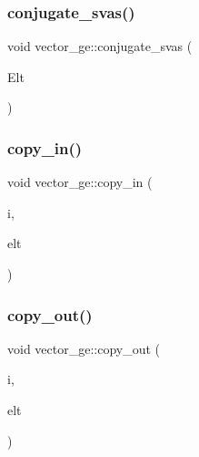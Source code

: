 \mbox{\label{classvector__ge_a8b245f21a8fead39b00df7b18593ea44}} 
\subsubsection{\texorpdfstring{conjugate\+\_\+svas()}{conjugate\_svas()}}
{\footnotesize\ttfamily void vector\+\_\+ge\+::conjugate\+\_\+svas (\begin{DoxyParamCaption}\item[{\mbox{\hyperlink{galois_8h_a09fddde158a3a20bd2dcadb609de11dc}{I\+NT}} $\ast$}]{Elt }\end{DoxyParamCaption})}

\mbox{\label{classvector__ge_ad02ebf2d4e8bbf095685aea921999145}} 
\subsubsection{\texorpdfstring{copy\+\_\+in()}{copy\_in()}}
{\footnotesize\ttfamily void vector\+\_\+ge\+::copy\+\_\+in (\begin{DoxyParamCaption}\item[{\mbox{\hyperlink{galois_8h_a09fddde158a3a20bd2dcadb609de11dc}{I\+NT}}}]{i,  }\item[{\mbox{\hyperlink{galois_8h_a09fddde158a3a20bd2dcadb609de11dc}{I\+NT}} $\ast$}]{elt }\end{DoxyParamCaption})}

\mbox{\label{classvector__ge_a3fd040b3b6f1227bd4a7696aba0adf37}} 
\subsubsection{\texorpdfstring{copy\+\_\+out()}{copy\_out()}}
{\footnotesize\ttfamily void vector\+\_\+ge\+::copy\+\_\+out (\begin{DoxyParamCaption}\item[{\mbox{\hyperlink{galois_8h_a09fddde158a3a20bd2dcadb609de11dc}{I\+NT}}}]{i,  }\item[{\mbox{\hyperlink{galois_8h_a09fddde158a3a20bd2dcadb609de11dc}{I\+NT}} $\ast$}]{elt }\end{DoxyParamCaption})}

